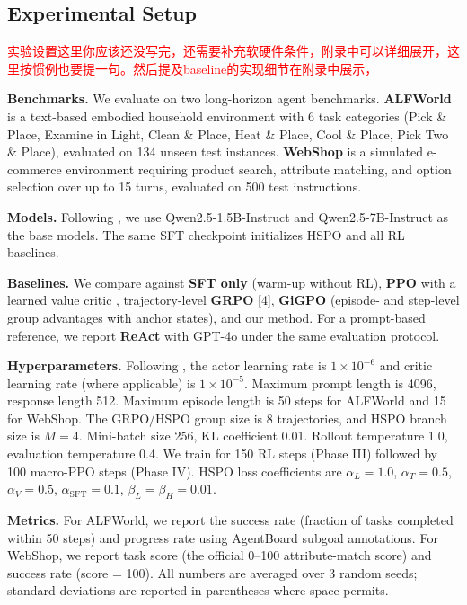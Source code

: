 \documentclass{article}
\newcommand{\gx}[1]{\textcolor{cyan}{#1}}
\newcommand{\wei}[1]{\textcolor{red}{#1}}
\begin{document}
\label{sec:exp}
\subsection{Experimental Setup} \wei{实验设置这里你应该还没写完，还需要补充软硬件条件，附录中可以详细展开，这里按惯例也要提一句。然后提及baseline的实现细节在附录中展示，}

\textbf{Benchmarks.} We evaluate on two long-horizon agent benchmarks. \textbf{ALFWorld} \cite{shridhar2021alfworld} is a text-based embodied household environment with 6 task categories (Pick \& Place, Examine in Light, Clean \& Place, Heat \& Place, Cool \& Place, Pick Two \& Place), evaluated on 134 unseen test instances. \textbf{WebShop} \cite{yao2022webshop} is a simulated e-commerce environment requiring product search, attribute matching, and option selection over up to 15 turns, evaluated on 500 test instructions.

\textbf{Models.} Following \cite{NEURIPS2025_420c9f77}, we use Qwen2.5-1.5B-Instruct and Qwen2.5-7B-Instruct as the base models. The same SFT checkpoint initializes HSPO and all RL baselines.

\textbf{Baselines.} We compare against \textbf{SFT only} (warm-up without RL), \textbf{PPO} with a learned value critic \cite{schulman2017proximal}, trajectory-level \textbf{GRPO} [4], \textbf{GiGPO} \cite{NEURIPS2025_420c9f77} (episode- and step-level group advantages with anchor states), and our method. For a prompt-based reference, we report \textbf{ReAct} \cite{yao2022react} with GPT-4o under the same evaluation protocol.

\textbf{Hyperparameters.} Following \cite{NEURIPS2025_420c9f77}, the actor learning rate is $1{\times}10^{-6}$ and critic learning rate (where applicable) is $1{\times}10^{-5}$. Maximum prompt length is 4096, response length 512. Maximum episode length is 50 steps for ALFWorld and 15 for WebShop. The GRPO/HSPO group size is 8 trajectories, and HSPO branch size is $M = 4$. Mini-batch size 256, KL coefficient 0.01. Rollout temperature 1.0, evaluation temperature 0.4. We train for 150 RL steps (Phase III) followed by 100 macro-PPO steps (Phase IV). HSPO loss coefficients are $\alpha_L = 1.0$, $\alpha_T = 0.5$, $\alpha_V = 0.5$, $\alpha_{\text{SFT}} = 0.1$, $\beta_L = \beta_H = 0.01$.

\textbf{Metrics.} For ALFWorld, we report the success rate (fraction of tasks completed within 50 steps) and progress rate using AgentBoard \cite{ma2024agentboard} subgoal annotations. For WebShop, we report task score (the official 0--100 attribute-match score) and success rate (score = 100). All numbers are averaged over 3 random seeds; standard deviations are reported in parentheses where space permits. %
\end{document}
